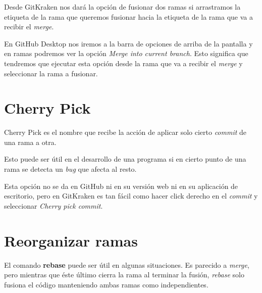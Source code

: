 Desde GitKraken nos dará la opción de fusionar dos ramas si arrastramos la etiqueta de la rama que queremos fusionar hacia la etiqueta de la rama que va a recibir el \textit{merge}.

En GitHub Desktop nos iremos a la barra de opciones de arriba de la pantalla y en ramas podremos ver la opción \textit{Merge into current branch}. Esto significa que tendremos que ejecutar esta opción desde la rama que va a recibir el \textit{merge} y seleccionar la rama a fusionar.

\section{Cherry Pick}

Cherry Pick es el nombre que recibe la acción de aplicar solo cierto \textit{commit} de una rama a otra.

Esto puede ser útil en el desarrollo de una programa si en cierto punto de una rama se detecta un \textit{bug} que afecta al resto.

Esta opción no se da en GitHub ni en su versión web ni en su aplicación de escritorio, pero en GitKraken es tan fácil como hacer click derecho en el \textit{commit} y seleccionar \textit{Cherry pick commit}.

\section{Reorganizar ramas}

El comando \textbf{rebase} puede ser útil en algunas situaciones. Es parecido a \textit{merge}, pero mientras que éste último cierra la rama al terminar la fusión, \textit{rebase} solo fusiona el código manteniendo ambas ramas como independientes.
